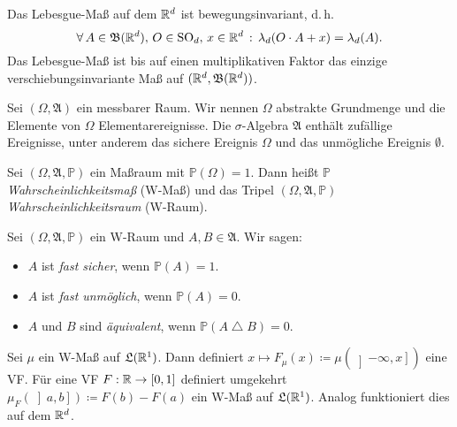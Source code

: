 \documentclass{cheat-sheet}
\newcommand{\Alg}{\mathfrak{A}} %
\newcommand{\LebAlg}{\mathfrak{L}} %
\renewcommand{\P}{\mathbb{P}} %
\newcommand{\Bor}{\mathfrak{B}} %
\DeclareMathOperator{\symmdiff}{\triangle}
\begin{document}
\begin{satz}
  Das Lebesgue-Maß auf dem $\mathbb{R}^d$ ist bewegungsinvariant, d.\,h.
  \[ \fa{A \in \Bor(\R^d), \, O \in \mathrm{SO}_d, \, x \in \R^d} \lambda_d(O \cdot A + x) = \lambda_d(A). \]
  Das Lebesgue-Maß ist bis auf einen multiplikativen Faktor das einzige verschiebungsinvariante Maß auf $(\R^d, \Bor(\R^d))$.
\end{satz}


\begin{sprech}
  Sei $(\Omega, \Alg)$ ein messbarer Raum. Wir nennen $\Omega$ abstrakte Grundmenge und die Elemente von $\Omega$ Elementarereignisse. Die $\sigma$-Algebra $\Alg$ enthält zufällige Ereignisse, unter anderem das sichere Ereignis $\Omega$ und das unmögliche Ereignis $\emptyset$.
\end{sprech}

\begin{defn}
  Sei $(\Omega, \Alg, \P)$ ein Maßraum mit $\P(\Omega) = 1$. Dann heißt $\P$ \emph{Wahrscheinlichkeitsmaß} (W-Maß) und das Tripel $(\Omega, \Alg, \P)$ \emph{Wahrscheinlichkeitsraum} (W-Raum).
\end{defn}

\begin{sprech}
  Sei $(\Omega, \Alg, \P)$ ein W-Raum und $A, B \in \Alg$. Wir sagen:
  \begin{itemize}
    \item $A$ ist \emph{fast sicher}, wenn $\P(A) = 1$.
    \item $A$ ist \emph{fast unmöglich}, wenn $\P(A) = 0$.
    \item $A$ und $B$ sind \emph{äquivalent}, wenn $\P(A \symmdiff B) = 0$.
  \end{itemize}
\end{sprech}



\begin{bem}
  Sei $\mu$ ein W-Maß auf $\LebAlg(\R^1)$. Dann definiert $x \mapsto F_{\mu}(x) \coloneqq \mu(\left] -\infty, x \right])$ eine VF. Für eine VF $F : \mathbb{R} \to [0,1]$ definiert umgekehrt $\mu_F(\left] a, b \right]) \coloneqq F(b) - F(a)$ ein W-Maß auf $\LebAlg(\R^1)$. Analog funktioniert dies auf dem $\mathbb{R}^d$.
\end{bem}

\end{document}

